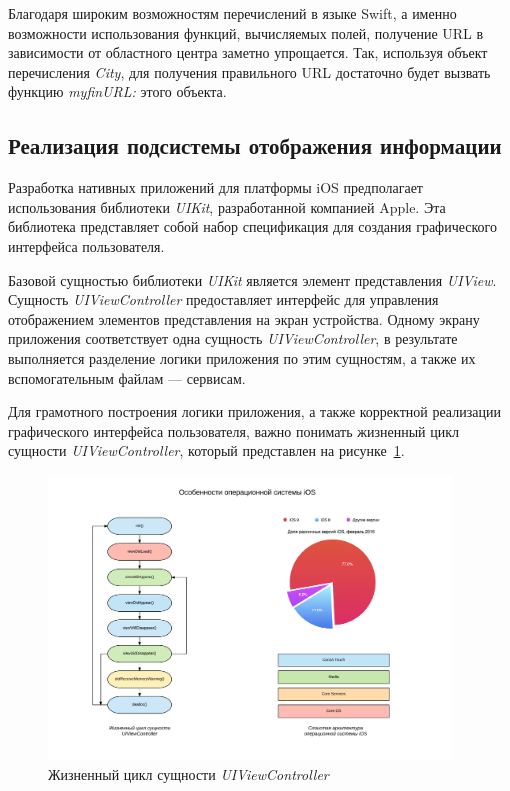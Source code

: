 Благодаря широким возможностям перечислений в языке Swift, а именно
возможности использования функций, вычисляемых полей, получение URL в
зависимости от областного центра заметно упрощается. Так, используя объект
перечисления \textit{City}, для получения правильного URL достаточно
будет вызвать функцию \textit{myfinURL:} этого объекта.



\subsection{Реализация подсистемы отображения информации}

Разработка нативных приложений для платформы iOS предполагает использования
библиотеки \textit{UIKit}, разработанной компанией Apple. Эта библиотека представляет
собой набор спецификация для создания графического интерфейса пользователя.

Базовой сущностью библиотеки \textit{UIKit} является элемент представления \textit{UIView}.
Сущность \textit{UIViewController} предоставляет интерфейс для управления отображением
элементов представления на экран устройства. Одному экрану приложения соответствует
одна сущность \textit{UIViewController}, в результате выполняется разделение
логики приложения по этим сущностям, а также их вспомогательным файлам --- сервисам.

Для грамотного построения логики приложения, а также корректной реализации графического
интерфейса пользователя, важно понимать жизненный цикл сущности \textit{UIViewController},
который представлен на рисунке~\ref{fig:vc_lifecycle}.
\begin{figure}[h!]
  \centering
  \includegraphics[width=107mm]{fig/vc_lifecycle}
  \caption{Жизненный цикл сущности \textit{UIViewController}}
  \label{fig:vc_lifecycle}
\end{figure}

